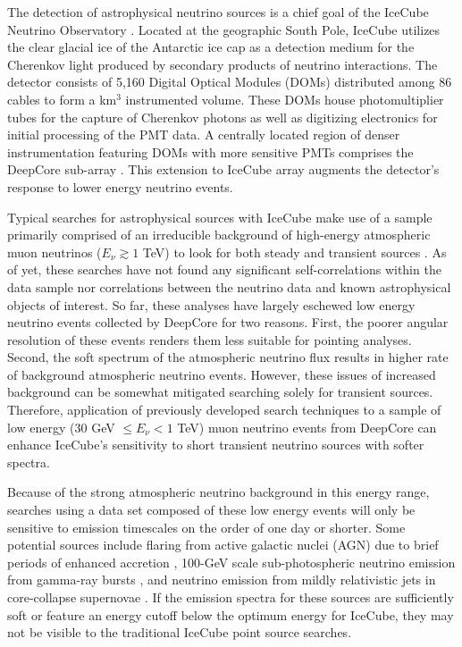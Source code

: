\documentclass[manuscript]{aastex}
\begin{document}
The detection of astrophysical neutrino sources is a chief goal of the IceCube Neutrino Observatory \citep{2006APh....26..155I}. Located at the geographic South Pole, IceCube utilizes the clear glacial ice of the Antarctic ice cap as a detection medium for the Cherenkov light produced by secondary products of neutrino interactions. The detector consists of 5,160 Digital Optical Modules (DOMs) distributed among 86 cables to form a km$^3$ instrumented volume. These DOMs house photomultiplier tubes for the capture of Cherenkov photons as well as digitizing electronics for initial processing of the PMT data. A centrally located region of denser instrumentation featuring DOMs with more sensitive PMTs comprises the DeepCore sub-array \citep{2012APh....35..615A}. This extension to IceCube array augments the detector's response to lower energy neutrino events.

Typical searches for astrophysical sources with IceCube make use of a sample primarily comprised of an irreducible background of high-energy atmospheric muon neutrinos ($E_{\nu} \gtrsim 1$ TeV) to look for both steady \citep{2014ApJ...796..109A} and transient sources \citep{2015arXiv150300598A}. As of yet, these searches have not found any significant self-correlations within the data sample nor correlations between the neutrino data and known astrophysical objects of interest. So far, these analyses have largely eschewed low energy neutrino events collected by DeepCore for two reasons. First, the poorer angular resolution of these events renders them less suitable for pointing analyses. Second, the soft spectrum of the atmospheric neutrino flux results in higher rate of background atmospheric neutrino events. However, these issues of increased background can be somewhat mitigated searching solely for transient sources. Therefore, application of previously developed search techniques to a sample of low energy (30 GeV $\leq E_{\nu} < 1$ TeV) muon neutrino events from DeepCore can enhance IceCube's sensitivity to short transient neutrino sources with softer spectra.

Because of the strong atmospheric neutrino background in this energy range, searches using a data set composed of these low energy events will only be sensitive to emission timescales on the order of one day or shorter. Some potential sources include flaring from active galactic nuclei (AGN) due to brief periods of enhanced accretion \citep{2009APh....31..138B}, 100-GeV scale sub-photospheric neutrino emission from gamma-ray bursts \citep{2013PhRvL.111m1102M}, and neutrino emission from mildly relativistic jets in core-collapse supernovae \citep{2005MPLA...20.2351R}. If the emission spectra for these sources are sufficiently soft or feature an energy cutoff below the optimum energy for IceCube, they may not be visible to the traditional IceCube point source searches.
\end{document}
